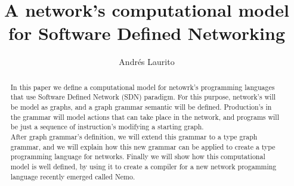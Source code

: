 \documentclass[envcountsect,runningheads]{llncs}
\title{A network's computational model for Software Defined Networking}
\author{Andr\'es Laurito}
\institute{
Departamento de Computac\'on - FCEN -UBA\\
 \email{andy.laurito@gmail.com} }
\begin{document}
\maketitle

\begin{abstract}
In this paper we define a computational model for netowrk's programming languages 
that use Software Defined Network (SDN) paradigm. For this purpose, 
network's will be model as graphs, and a graph grammar semantic will be defined. 
Production's in the grammar will model actions that can take place in the network, and programs 
will be just a sequence of instruction's modifying a starting graph. \\
After graph grammar's definition, we will extend this grammar to a type graph grammar, and we 
will explain how this new grammar can be applied to create a type programming language 
for networks. Finally we will show how this computational model is well defined, by using it to 
create a compiler for a new network progamming language recently emerged called Nemo. 
\end{abstract}
\end{document}
